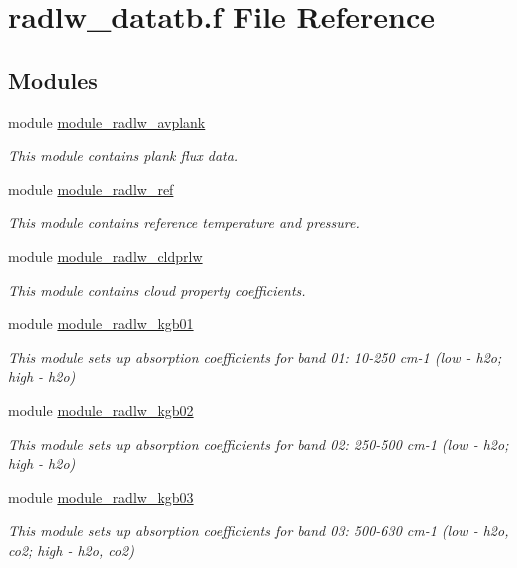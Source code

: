 \hypertarget{radlw__datatb_8f}{}\section{radlw\+\_\+datatb.\+f File Reference}
\label{radlw__datatb_8f}
\subsection*{Modules}
\begin{DoxyCompactItemize}
\item 
module \hyperlink{namespacemodule__radlw__avplank}{module\+\_\+radlw\+\_\+avplank}
\begin{DoxyCompactList}\small\item\em This module contains plank flux data. \end{DoxyCompactList}\item 
module \hyperlink{namespacemodule__radlw__ref}{module\+\_\+radlw\+\_\+ref}
\begin{DoxyCompactList}\small\item\em This module contains reference temperature and pressure. \end{DoxyCompactList}\item 
module \hyperlink{namespacemodule__radlw__cldprlw}{module\+\_\+radlw\+\_\+cldprlw}
\begin{DoxyCompactList}\small\item\em This module contains cloud property coefficients. \end{DoxyCompactList}\item 
module \hyperlink{namespacemodule__radlw__kgb01}{module\+\_\+radlw\+\_\+kgb01}
\begin{DoxyCompactList}\small\item\em This module sets up absorption coefficients for band 01\+: 10-\/250 cm-\/1 (low -\/ h2o; high -\/ h2o) \end{DoxyCompactList}\item 
module \hyperlink{namespacemodule__radlw__kgb02}{module\+\_\+radlw\+\_\+kgb02}
\begin{DoxyCompactList}\small\item\em This module sets up absorption coefficients for band 02\+: 250-\/500 cm-\/1 (low -\/ h2o; high -\/ h2o) \end{DoxyCompactList}\item 
module \hyperlink{namespacemodule__radlw__kgb03}{module\+\_\+radlw\+\_\+kgb03}
\begin{DoxyCompactList}\small\item\em This module sets up absorption coefficients for band 03\+: 500-\/630 cm-\/1 (low -\/ h2o, co2; high -\/ h2o, co2) \end{DoxyCompactList}\item 

\end{DoxyCompactItemize}
